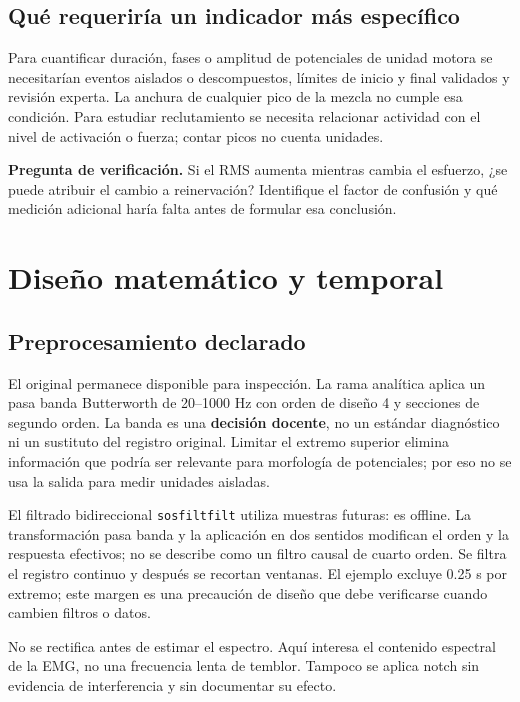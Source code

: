 \documentclass[
  spanish,
  10.5pt,
  a4paper,
  DIV=11,
  numbers=noendperiod]{scrartcl}
\begin{document}
\subsection{Qué requeriría un indicador más
específico}\label{quuxe9-requeriruxeda-un-indicador-muxe1s-especuxedfico}

Para cuantificar duración, fases o amplitud de potenciales de unidad
motora se necesitarían eventos aislados o descompuestos, límites de
inicio y final validados y revisión experta. La anchura de cualquier
pico de la mezcla no cumple esa condición. Para estudiar reclutamiento
se necesita relacionar actividad con el nivel de activación o fuerza;
contar picos no cuenta unidades.

\textbf{Pregunta de verificación.} Si el RMS aumenta mientras cambia el
esfuerzo, ¿se puede atribuir el cambio a reinervación? Identifique el
factor de confusión y qué medición adicional haría falta antes de
formular esa conclusión.

\section{Diseño matemático y
temporal}\label{diseuxf1o-matemuxe1tico-y-temporal}

\subsection{Preprocesamiento
declarado}\label{preprocesamiento-declarado}

El original permanece disponible para inspección. La rama analítica
aplica un pasa banda Butterworth de 20--1000 Hz con orden de diseño 4 y
secciones de segundo orden. La banda es una \textbf{decisión docente},
no un estándar diagnóstico ni un sustituto del registro original.
Limitar el extremo superior elimina información que podría ser relevante
para morfología de potenciales; por eso no se usa la salida para medir
unidades aisladas.

El filtrado bidireccional \texttt{sosfiltfilt} utiliza muestras futuras:
es offline. La transformación pasa banda y la aplicación en dos sentidos
modifican el orden y la respuesta efectivos; no se describe como un
filtro causal de cuarto orden. Se filtra el registro continuo y después
se recortan ventanas. El ejemplo excluye 0.25 s por extremo; este margen
es una precaución de diseño que debe verificarse cuando cambien filtros
o datos.

No se rectifica antes de estimar el espectro. Aquí interesa el contenido
espectral de la EMG, no una frecuencia lenta de temblor. Tampoco se
aplica notch sin evidencia de interferencia y sin documentar su efecto.
\end{document}
